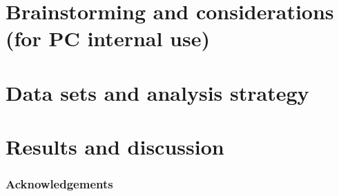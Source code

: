 \documentclass[ALICE,manyauthors]{cernphprep}
\begin{document}

\tableofcontents
\cleardoublepage 
{} 


\part{Brainstorming and considerations (for PC internal use)}



\part{Data sets and analysis strategy}




\part{Results and discussion}



\cleardoublepage %






\newenvironment{acknowledgement}{\relax}{\relax}
\begin{acknowledgement}
\section*{Acknowledgements}
\end{acknowledgement}
\end{document}
